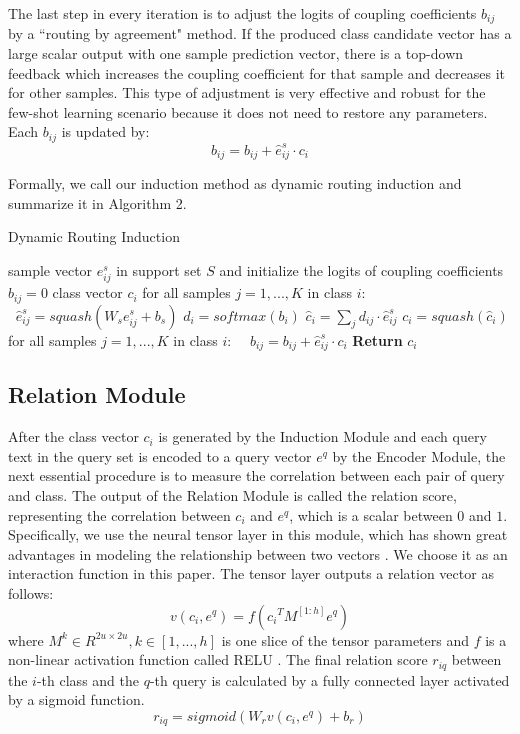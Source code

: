 \documentclass[11pt,a4paper]{article}
\begin{document}
The last step in every iteration is to adjust the logits of coupling coefficients $b_{ij}$ by a ``routing by agreement" method. If the produced class candidate vector has a large scalar output with one sample prediction vector, there is a top-down feedback which increases the coupling coefficient for that sample and decreases it for other samples. This type of adjustment is very effective and robust for the few-shot learning scenario because it does not need to restore any parameters. Each $b_{ij}$ is updated by:
\begin{equation}
{b_{ij}} = {b_{ij}} + {\hat{e}_{ij}^s} \cdot {c_i}
\end{equation}

Formally, we call our induction method as dynamic routing induction and summarize it in Algorithm 2.
\begin{algorithm}[t]
\caption{Dynamic Routing Induction}
\begin{algorithmic}[1]
\REQUIRE sample vector ${e}_{ij}^s$ in support set $S$ and initialize the logits of coupling coefficients ${b_{ij}}=0$
\ENSURE class vector $c_i$
\STATE for all samples $j=1,...,K$ in class $i$:
\STATE $\;\;{\hat{e}_{ij}^s} = squash({W_s}{{e}_{ij}^s} + b_s)$
\STATE ${d_{i}} = softmax \left( {b_{i}} \right)$
\STATE ${\hat{c}_i} =  {\sum\limits_j {{d_{ij}} \cdot {\hat{e}_{ij}^s}} } $
\STATE ${c_i} = squash(\hat{c}_i)$
\STATE for all samples $j=1,...,K$ in class $i$:
\STATE $\quad{b_{ij}} = {b_{ij}} + {\hat{e}_{ij}^s} \cdot {c_i}$
\ENDFOR
\STATE \textbf{Return} $c_i$
\label{induction algorithm_alg}
\end{algorithmic}
\end{algorithm}

\subsection{Relation Module}
After the class vector $c_i$ is generated by the Induction Module and each query text in the query set is encoded to a query vector $e^q$ by the Encoder Module, the next essential procedure is to measure the correlation between each pair of query and class.
The output of the Relation Module is called the relation score, representing the correlation between $c_i$ and $e^q$, which is a scalar between $0$ and $1$. Specifically, we use the neural tensor layer \citep{socher2013reasoning} in this module, which has shown great advantages in modeling the relationship between two vectors \citep{wan2016deep,geng2017implicit}. We choose it as an interaction function in this paper. The tensor layer outputs a relation vector as follows:
\begin{equation}
v({c_i},{e^q}) = f\left( {c_i}^T{M^{[1:h]}}{e^q} \right)
\end{equation}
where ${M^k} \in {R^{2u \times 2u}},k \in \left[ {1,...,h} \right]$ is one slice of the tensor parameters and $f$ is a non-linear activation function called RELU \citep{glorot2011deep}. The final relation score $r_{iq}$ between the $i$-th class and the $q$-th query is calculated by a fully connected layer activated by a sigmoid function.
\begin{equation}
r_{iq}=sigmoid({W_r}v({c_i},{e^q})+b_r)
\end{equation}
\end{document}
